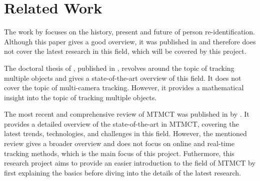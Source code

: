 \section{Related Work}\label{sec:related_work}
The work  by \textcite{Zheng16c} focuses on the history, present and future of person re-identification.
Although this paper gives a good overview, it was published in \citeyear{Zheng16c} and therefore does not cover the latest research in this field, which will be covered by this project.

The doctoral thesis of \textcite[Chapter 5]{Tian19}, published in \citeyear{Tian19}, revolves around the topic of tracking multiple objects and gives a state-of-the-art overview of this field. It does not cover the topic of multi-camera tracking. However, it provides a mathematical insight into the topic of tracking multiple objects.

The most recent and comprehensive review of MTMCT was published in \citeyear{Amosa23} by \textcite{Amosa23}. It provides a detailed overview of the state-of-the-art in MTMCT, covering the latest trends, technologies, and challenges in this field. However, the mentioned review gives a broader overview and does not focus on online and real-time tracking methods, which is the main focus of this project. Futhermore, this research project aims to provide an easier introduction to the field of MTMCT by first explaining the basics before diving into the details of the latest research.